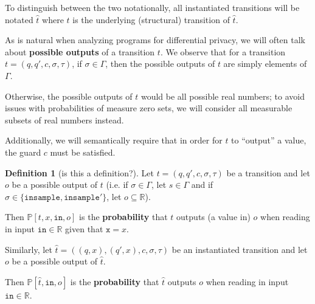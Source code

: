\documentclass[12pt]{article}
\newcommand{\RR}{\mathbb{R}}
\newcommand{\PP}{\mathbb{P}}
\theoremstyle{definition}
\newtheorem{defn}[thm]{Definition}
\begin{document}
To distinguish between the two notationally, all instantiated transitions will be notated $\hat{t}$ where $t$ is the underlying (structural) transition of $\hat{t}$. 

As is natural when analyzing programs for differential privacy, we will often talk about \textbf{possible outputs} of a transition $t$. We observe that for a transition $t = (q, q', c, \sigma, \tau)$, if $\sigma \in \Gamma$, then the possible outputs of $t$ are simply elements of $\Gamma$. 

Otherwise, the possible outputs of $t$ would be all possible real numbers; to avoid issues with probabilities of measure zero sets, we will consider all measurable subsets of real numbers instead. 

Additionally, we will semantically require that in order for $t$ to ``output'' a value, the guard $c$ must be satisfied. 

\begin{defn}[is this a definition?]
    Let $t = (q, q', c, \sigma, \tau)$ be a transition and let $o$ be a possible output of $t$ (i.e. if $\sigma \in \Gamma$, let $s\in \Gamma$ and if $\sigma \in \{\texttt{insample}, \texttt{insample}'\}$, let $o\subseteq \RR$).

    Then $\PP[t, x, \texttt{in}, o]$ is the \textbf{probability} that $t$ outputs (a value in) $o$ when reading in input $\texttt{in} \in \RR$ given that $\texttt{x} = x$.

    Similarly, let $\hat{t} = ((q, x), (q', x), c, \sigma, \tau)$ be an instantiated transition and let $o$ be a possible output of $\hat{t}$. 

    Then $\PP[\hat{t}, \texttt{in}, o]$ is the \textbf{probability} that $\hat{t}$ outputs $o$ when reading in input $\texttt{in} \in \RR$.
\end{defn}
\end{document}
